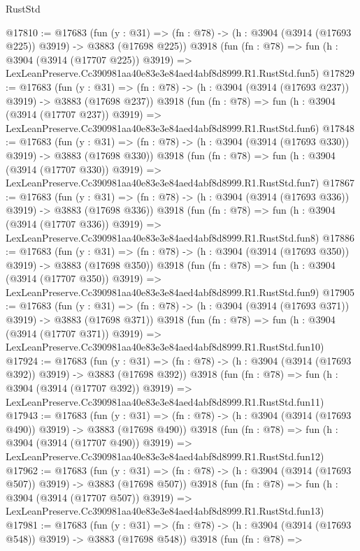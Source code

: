 \begin{lexlean}{RustStd}
\begin{coremodule}
@17810 := @17683
    (fun (y : @31) => (fn : @78) -> (h : @3904 (@3914 (@17693 @225)) @3919) -> @3883 (@17698 @225))
    @3918
    (fun (fn : @78) =>
    fun (h : @3904 (@3914 (@17707 @225)) @3919) =>
    LexLeanPreserve.Cc390981aa40e83e3e84aed4abf8d8999.R1.RustStd.fun5)
@17829 := @17683
    (fun (y : @31) => (fn : @78) -> (h : @3904 (@3914 (@17693 @237)) @3919) -> @3883 (@17698 @237))
    @3918
    (fun (fn : @78) =>
    fun (h : @3904 (@3914 (@17707 @237)) @3919) =>
    LexLeanPreserve.Cc390981aa40e83e3e84aed4abf8d8999.R1.RustStd.fun6)
@17848 := @17683
    (fun (y : @31) => (fn : @78) -> (h : @3904 (@3914 (@17693 @330)) @3919) -> @3883 (@17698 @330))
    @3918
    (fun (fn : @78) =>
    fun (h : @3904 (@3914 (@17707 @330)) @3919) =>
    LexLeanPreserve.Cc390981aa40e83e3e84aed4abf8d8999.R1.RustStd.fun7)
@17867 := @17683
    (fun (y : @31) => (fn : @78) -> (h : @3904 (@3914 (@17693 @336)) @3919) -> @3883 (@17698 @336))
    @3918
    (fun (fn : @78) =>
    fun (h : @3904 (@3914 (@17707 @336)) @3919) =>
    LexLeanPreserve.Cc390981aa40e83e3e84aed4abf8d8999.R1.RustStd.fun8)
@17886 := @17683
    (fun (y : @31) => (fn : @78) -> (h : @3904 (@3914 (@17693 @350)) @3919) -> @3883 (@17698 @350))
    @3918
    (fun (fn : @78) =>
    fun (h : @3904 (@3914 (@17707 @350)) @3919) =>
    LexLeanPreserve.Cc390981aa40e83e3e84aed4abf8d8999.R1.RustStd.fun9)
@17905 := @17683
    (fun (y : @31) => (fn : @78) -> (h : @3904 (@3914 (@17693 @371)) @3919) -> @3883 (@17698 @371))
    @3918
    (fun (fn : @78) =>
    fun (h : @3904 (@3914 (@17707 @371)) @3919) =>
    LexLeanPreserve.Cc390981aa40e83e3e84aed4abf8d8999.R1.RustStd.fun10)
@17924 := @17683
    (fun (y : @31) => (fn : @78) -> (h : @3904 (@3914 (@17693 @392)) @3919) -> @3883 (@17698 @392))
    @3918
    (fun (fn : @78) =>
    fun (h : @3904 (@3914 (@17707 @392)) @3919) =>
    LexLeanPreserve.Cc390981aa40e83e3e84aed4abf8d8999.R1.RustStd.fun11)
@17943 := @17683
    (fun (y : @31) => (fn : @78) -> (h : @3904 (@3914 (@17693 @490)) @3919) -> @3883 (@17698 @490))
    @3918
    (fun (fn : @78) =>
    fun (h : @3904 (@3914 (@17707 @490)) @3919) =>
    LexLeanPreserve.Cc390981aa40e83e3e84aed4abf8d8999.R1.RustStd.fun12)
@17962 := @17683
    (fun (y : @31) => (fn : @78) -> (h : @3904 (@3914 (@17693 @507)) @3919) -> @3883 (@17698 @507))
    @3918
    (fun (fn : @78) =>
    fun (h : @3904 (@3914 (@17707 @507)) @3919) =>
    LexLeanPreserve.Cc390981aa40e83e3e84aed4abf8d8999.R1.RustStd.fun13)
@17981 := @17683
    (fun (y : @31) => (fn : @78) -> (h : @3904 (@3914 (@17693 @548)) @3919) -> @3883 (@17698 @548))
    @3918
    (fun (fn : @78) =>

\end{coremodule}
\end{lexlean}
